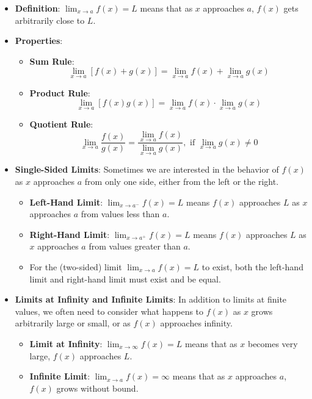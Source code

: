 \begin{itemize}

\item \textbf{Definition}: $\lim_{x \to a} f(x) = L$ means that as $x$ approaches $a$, $f(x)$ gets arbitrarily close to $L$.

\item \textbf{Properties}:
\begin{itemize}
\item \textbf{Sum Rule}: \[\lim_{x \to a} [f(x) + g(x)] = \lim_{x \to a} f(x) + \lim_{x \to a} g(x)\]
\item \textbf{Product Rule}: \[\lim_{x \to a} [f(x)g(x)] = \lim_{x \to a} f(x) \cdot \lim_{x \to a} g(x)\]
\item \textbf{Quotient Rule}: \[\lim_{x \to a} \frac{f(x)}{g(x)} = \frac{\lim_{x \to a} f(x)}{\lim_{x \to a} g(x)}, \text{ if } \lim_{x \to a} g(x) \neq 0\]
\end{itemize}

\item \textbf{Single-Sided Limits}: 
Sometimes we are interested in the behavior of $f(x)$ as $x$ approaches $a$ from only one side, either from the left or the right.

\begin{itemize}
\item \textbf{Left-Hand Limit}: $\lim_{x \to a^-} f(x) = L$ means $f(x)$ approaches $L$ as $x$ approaches $a$ from values less than $a$.
\item \textbf{Right-Hand Limit}: $\lim_{x \to a^+} f(x) = L$ means $f(x)$ approaches $L$ as $x$ approaches $a$ from values greater than $a$.
\item For the (two-sided) limit $\lim_{x \to a} f(x) = L$ to exist, both the left-hand limit and right-hand limit must exist and be equal.
\end{itemize}

\item \textbf{Limits at Infinity and Infinite Limits}: 
In addition to limits at finite values, we often need to consider what happens to $f(x)$ as $x$ grows arbitrarily large or small, or as $f(x)$ approaches infinity.

\begin{itemize}
\item \textbf{Limit at Infinity}: $\lim_{x \to \infty} f(x) = L$ means that as $x$ becomes very large, $f(x)$ approaches $L$.
\item \textbf{Infinite Limit}: $\lim_{x \to a} f(x) = \infty$ means that as $x$ approaches $a$, $f(x)$ grows without bound.
\end{itemize}


\end{itemize}
